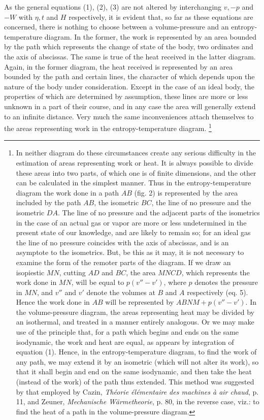 \documentclass[11pt]{article}
\begin{document}
As the general equations (1), (2), (3) are not altered by interchanging $v,-p$ and $-W$ with $\eta,t$ and $H$ respectively, it is evident that, so far as these equations are concerned, there is nothing to choose between a volume-pressure and an entropy-temperature diagram. In the former, the work is represented by an area bounded by the path which represents the change of state of the body, two ordinates and the axis of abscissas. The same is true of the heat received in the latter diagram. Again, in the former diagram, the heat received is represented by an area bounded by the path and certain lines, the character of which depends upon the nature of the body under consideration. Except in the case of an ideal body, the properties of which are determined by assumption, these lines are more or less unknown in a part of their course, and in any case the area will generally extend to an infinite distance. Very much the same inconveniences attach themselves to the areas representing work in the entropy-temperature diagram.
\footnote{In neither diagram do these circumstances create any serious difficulty in the estimation of areas representing work or heat. It is always possible to divide these areas into two parts, of which one is of finite dimensions, and the other can be calculated in the simplest manner. Thus in the entropy-temperature diagram the work done in a path $AB$ (fig. 2) is represented by the area included by the path $AB$, the isometric $BC$, the line of no pressure and the isometric $DA$. The line of no pressure and the adjacent parts of the isometrics in the case of an actual gas or vapor are more or less undetermined in the present state of our knowledge, and are likely to remain so; for an ideal gas the line of no pressure coincides with the axis of abscissas, and is an asymptote to the isometrics. But, be this as it may, it is not necessary to examine the form of the remoter parts of the diagram. If we draw an isopiestic $MN$, cutting $AD$ and $BC$, the area $MNCD$, which represents the work done in $MN$, will be equal to $p(v''-v')$, where $p$ denotes the pressure in $MN$, and $v''$ and $v'$ denote the volumes at $B$ and $A$ respectively (eq. 5). Hence the work done in $AB$ will be represented by $ABNM+p(v''-v')$. In the volume-pressure diagram, the areas representing heat may be divided by an isothermal, and treated in a manner entirely analogous. Or we may make use of the principle that, for a path which begins and ends on the same isodynamic, the work and heat are equal, as appears by integration of equation (1). Hence, in the entropy-temperature diagram, to find the work of any path, we may extend it by an isometric (which will not alter its work), so that it shall begin and end on the same isodynamic, and then take the heat (instead of the work) of the path thus extended. This method was suggested by that employed by Cazin, \emph{Th\'eorie \'el\'ementaire des machines \`a air chaud}, p. 11, and Zeuner, \emph{Mechanische W\"armetheorie}, p. 80, in the reverse case, viz.: to find the heat of a path in the volume-pressure diagram.}
\end{document}
